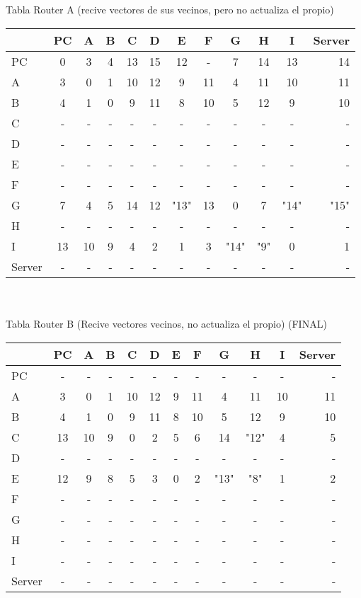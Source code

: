 \documentclass{article}
\begin{document}
\\
\\
Tabla Router A (recive vectores de sus vecinos, pero no actualiza el propio) \\
\begin{tabular}{l*{10}{c}r}
              & PC & A & B & C & D & E & F & G & H & I & Server \\
\hline
PC             & 0 & 3 & 4 & 13& 15& 12& - & 7 & 14 & 13 & 14\\
A              & 3 & 0 & 1 & 10 & 12 & 9 & 11 & 4 & 11 & 10 & 11 \\
B              & 4 & 1 & 0 & 9 & 11	& 8 & 10 & 5 & 12 & 9 & 10\\
C              & - & - & - & - & - & - & - & - & - & - & -\\
D              & - & - & - & - & - & - & - & - & - & - & -\\
E              & - & - & - & - & - & - & - & - & - & - & -\\
F              & - & - & - & - & - & - & - & - & - & - & -\\
G              & 7 & 4 & 5 & 14 & 12 & "13" & 13 & 0 & 7 & "14" & "15"\\
H              & - & - & - & - & - & -	 & - & - & - & - & -\\
I              & 13 & 10 & 9 & 4 & 2 & 1 & 3 & "14" & "9" & 0 & 1\\
Server         & - & - & - & - & - & - & - & - & - & - & -\\

\end{tabular}
\\
\\
Tabla Router B (Recive vectores vecinos, no actualiza el propio) (FINAL) \\
\begin{tabular}{l*{10}{c}r}
              & PC & A & B & C & D & E & F & G & H & I & Server \\
\hline
PC             & - & - & - & - & - & - & - & - & - & - & -\\
A              & 3 & 0 & 1 & 10 & 12 & 9 & 11 & 4 & 11 & 10 & 11 \\
B              & 4 & 1 & 0 & 9 & 11 & 8 & 10 & 5 & 12 & 9 & 10\\
C              & 13 & 10 & 9 & 0 & 2 & 5 & 6 & 14 & "12" & 4 & 5\\
D              & - & - & - & - & - & - & - & - & - & - & -\\
E              & 12 & 9 & 8 & 5 & 3 & 0 & 2 & "13" & "8" & 1 & 2\\
F              & - & - & - & - & - & - & - & - & - & - & -\\
G              & - & - & - & - & - & - & - & - & - & - & -\\
H              & - & - & - & - & - & - & - & - & - & - & -\\
I              & - & - & - & - & - & - & - & - & - & - & -\\
Server         & - & - & - & - & - & - & - & - & - & - & -\\

\end{tabular}
\end{document}
